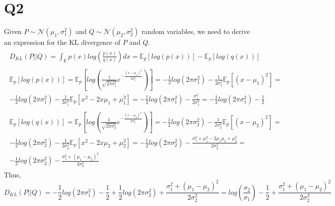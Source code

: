 \documentclass[11pt]{article}
\begin{document}
\part*{Q2}
Given $P \sim \mathcal{N}(\mu_1, \sigma_1^2)$ and $Q \sim \mathcal{N}(\mu_2, \sigma_2^2)$ random variables, we need to derive an expression for the KL divergence of $P$ and $Q$.
\begin{align*}
	\begin{split}
		D_{KL}(P||Q) = \int_{\mathds{R}} p(x) log \left(\frac{p(x)}{q(x)} \right)dx =  \mathds{E}_p[log(p(x))] - \mathds{E}_p[log(q(x))]
	\end{split}\\
	\begin{split}
		\mathds{E}_p[log(p(x))] = \mathds{E}_p\left[log\left(\frac{1}{\sqrt{2\pi\sigma_1^2}}e^{-\frac{(x-\mu_1)^2}{2\sigma_1^2}}\right)\right] =
		-\frac{1}{2}log(2\pi\sigma_1^2) - \frac{1}{2\sigma_1^2}\mathds{E}_p[(x-\mu_1)^2] = \\ -\frac{1}{2}log(2\pi\sigma_1^2) - \frac{1}{2\sigma_1^2}\mathds{E}_p[x^2 - 2x\mu_1 + \mu_1^2] =
		 -\frac{1}{2}log(2\pi\sigma_1^2) - \frac{\sigma_1^2}{2\sigma_1^2} = -\frac{1}{2}log(2\pi\sigma_1^2) - \frac{1}{2}
	\end{split}	\\
	\begin{split}
		\mathds{E}_p[log(q(x))] = \mathds{E}_p\left[log\left(\frac{1}{\sqrt{2\pi\sigma_2^2}}e^{-\frac{(x-\mu_2)^2}{2\sigma_2^2}}\right)\right] = 
		-\frac{1}{2}log(2\pi\sigma_2^2) - \frac{1}{2\sigma_2^2}\mathds{E}_p[(x-\mu_2)^2] = \\
		-\frac{1}{2}log(2\pi\sigma_2^2) - \frac{1}{2\sigma_2^2}\mathds{E}_p[x^2 - 2x\mu_2 + \mu_2^2] = 
		-\frac{1}{2}log(2\pi\sigma_2^2) - \frac{\sigma_1^2+\mu_1^2-2\mu_1\mu_2+\mu_2^2}{2\sigma_2^2} = \\
		-\frac{1}{2}log(2\pi\sigma_2^2) - \frac{\sigma_1^2+(\mu_1-\mu_2)^2}{2\sigma_2^2}
	\end{split}
\end{align*}
Thus,
\begin{equation*}
	D_{KL}(P||Q) = -\frac{1}{2}log(2\pi\sigma_1^2) - \frac{1}{2} + \frac{1}{2}log(2\pi\sigma_2^2) + \frac{\sigma_1^2+(\mu_1-\mu_2)^2}{2\sigma_2^2} = log\left(\frac{\sigma_2}{\sigma_1}\right) - \frac{1}{2} + \frac{\sigma_1^2+(\mu_1-\mu_2)^2}{2\sigma_2^2}
\end{equation*}
\end{document}
